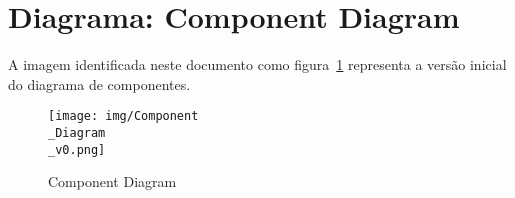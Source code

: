 
\section{Diagrama: Component Diagram}
A imagem identificada neste documento como figura~\ref{fig:cd3120} representa a versão inicial do diagrama de componentes.

\begin{figure}[htb]
	\centering
	\texttt{[image: img/Component\\\_Diagram\\\_v0.png]}  %
	\caption{Component Diagram}
	\label{fig:cd3120}
\end{figure}

